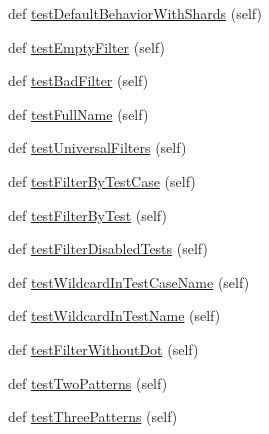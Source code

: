 \begin{DoxyCompactItemize}
\item 
def \mbox{\hyperlink{classgtest__filter__unittest_1_1GTestFilterUnitTest_a8d5ad564f41c052864a3957a71daa535}{test\+Default\+Behavior\+With\+Shards}} (self)
\item 
def \mbox{\hyperlink{classgtest__filter__unittest_1_1GTestFilterUnitTest_afce65847b463ec5bca4458e9348d9a9f}{test\+Empty\+Filter}} (self)
\item 
def \mbox{\hyperlink{classgtest__filter__unittest_1_1GTestFilterUnitTest_a2456062c177350a53244aea030aaf617}{test\+Bad\+Filter}} (self)
\item 
def \mbox{\hyperlink{classgtest__filter__unittest_1_1GTestFilterUnitTest_a336d9203e26493bae11fbb514af38a6b}{test\+Full\+Name}} (self)
\item 
def \mbox{\hyperlink{classgtest__filter__unittest_1_1GTestFilterUnitTest_ae9da48a79483e22e3f986e57de0dee37}{test\+Universal\+Filters}} (self)
\item 
def \mbox{\hyperlink{classgtest__filter__unittest_1_1GTestFilterUnitTest_ac59206c94324afdc09adbe5853856174}{test\+Filter\+By\+Test\+Case}} (self)
\item 
def \mbox{\hyperlink{classgtest__filter__unittest_1_1GTestFilterUnitTest_aaea691324a6c0765403b26a895702a63}{test\+Filter\+By\+Test}} (self)
\item 
def \mbox{\hyperlink{classgtest__filter__unittest_1_1GTestFilterUnitTest_a6d962adae2ee2697b3b92e84b60a795a}{test\+Filter\+Disabled\+Tests}} (self)
\item 
def \mbox{\hyperlink{classgtest__filter__unittest_1_1GTestFilterUnitTest_af855132606c1fa02fb765e8619108114}{test\+Wildcard\+In\+Test\+Case\+Name}} (self)
\item 
def \mbox{\hyperlink{classgtest__filter__unittest_1_1GTestFilterUnitTest_a9b1e6b35e158d7c6d11b8f4d2cb600cb}{test\+Wildcard\+In\+Test\+Name}} (self)
\item 
def \mbox{\hyperlink{classgtest__filter__unittest_1_1GTestFilterUnitTest_a874aea28690300d8c0dc0910304f7ab2}{test\+Filter\+Without\+Dot}} (self)
\item 
def \mbox{\hyperlink{classgtest__filter__unittest_1_1GTestFilterUnitTest_a2563885e647205586b135c5ead55e6ab}{test\+Two\+Patterns}} (self)
\item 
def \mbox{\hyperlink{classgtest__filter__unittest_1_1GTestFilterUnitTest_af4858e153245f0974632fd36dc1dd804}{test\+Three\+Patterns}} (self)
\item 
\mbox{\label{classgtest__filter__unittest_1_1GTestFilterUnitTest_aff878809d524797f62e2fe38bbfcc8da}} 

\end{DoxyCompactItemize}
